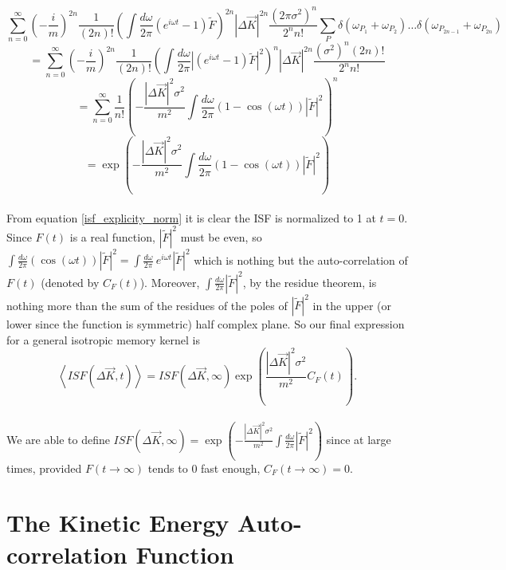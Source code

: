 $$
\sum_{n=0}^{\infty} \left(- \frac{i}{m}\right)^{2n} \frac{1}{(2n)!} \left( \int \frac{d\omega}{2\pi} \left(e^{i\omega t} - 1\right) \tilde{F}\right)^{2n} \left|\Delta \vec{K}\right|^{2n} \frac{\left(2\pi\sigma^2\right)^n}{2^nn!} \sum_P \delta\left(\omega_{P_1} + \omega_{P_2}\right) \ldots \delta\left(\omega_{P_{2n-1}} + \omega_{P_{2n}}\right)
$$
$$
= \sum_{n=0}^{\infty} \left(- \frac{i}{m}\right)^{2n} \frac{1}{(2n)!} \left( \int \frac{d\omega}{2\pi} \left|\left(e^{i\omega t} - 1\right) \tilde{F}\right|^2\right)^{n} \left|\Delta \vec{K}\right|^{2n} \frac{\left(\sigma^2\right)^n(2n)!}{2^nn!}
$$
$$
= \sum_{n=0}^{\infty} \frac{1}{n!} \left(-\frac{|\Delta \vec{K}|^2 \sigma^2}{m^2} \int \frac{d\omega}{2\pi}\left(1 - \cos\left(\omega t\right)\right) \left| \tilde{F} \right|^2\right)^n
$$
\begin{equation}
= \exp\left(-\frac{|\Delta \vec{K}|^2 \sigma^2}{m^2} \int \frac{d\omega}{2\pi}\left(1 - \cos\left(\omega t\right)\right) \left| \tilde{F} \right|^2\right) \label{isf_explicity_norm}
\end{equation}
\\
From equation \ref{isf_explicity_norm} it is clear the ISF is normalized to 1 at $t=0$. Since $F(t)$ is a real function, $|\tilde{F}|^2$ must be even, so $\int \frac{d\omega}{2\pi}\left(\cos\left(\omega t\right)\right) \left| \tilde{F} \right|^2 = \int \frac{d\omega}{2\pi}\ e^{i \omega t} \left| \tilde{F} \right|^2$ which is nothing but the auto-correlation of $F(t)$ (denoted by $C_F(t)$). Moreover, $\int \frac{d\omega}{2\pi}\left| \tilde{F} \right|^2$, by the residue theorem, is nothing more than the sum of the residues of the poles of $\left|\tilde{F}\right|^2$ in the upper (or lower since the function is symmetric) half complex plane. So our final expression for a general isotropic memory kernel is
\begin{equation}
\left<ISF(\Delta \vec{K}, t)\right> = ISF\left(\Delta \vec{K}, \infty \right)\exp\left(\frac{|\Delta \vec{K}|^2 \sigma^2}{m^2} C_F\left(t\right) \right). \label{isf_compact} 
\end{equation}
\\
We are able to define $ISF\left(\Delta \vec{K}, \infty \right)= \exp \left( -\frac{|\Delta \vec{K}|^2 \sigma^2}{m^2} \int \frac{d\omega}{2\pi} \left| \tilde{F} \right|^2 \right)$ since at large times, provided $F(t \rightarrow \infty)$ tends to $0$ fast enough, $C_F(t \rightarrow \infty) = 0$.

\section{The Kinetic Energy Auto-correlation Function \label{kinetic_autocorrelation}}

